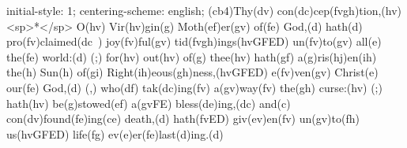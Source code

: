 initial-style: 1;
centering-scheme: english;
(cb4)Thy(dv) con(dc)cep(fvgh)tion,(hv) <sp>*</sp> O(hv) Vir(hv)gin(g) Moth(ef)er(gv) of(fe) God,(d) hath(d) pro(fv)claimed(dc~) joy(fv)ful(gv) tid(fvgh)ings(hvGFED) un(fv)to(gv) all(e) the(fe) world:(d) (;) for(hv) out(hv) of(g) thee(hv) hath(gf) a(g)ris(hj)en(ih) the(h) Sun(h) of(gi) Right(ih)eous(gh)ness,(hvGFED) e(fv)ven(gv) Christ(e) our(fe) God,(d) (,) who(df) tak(dc)ing(fv) a(gv)way(fv) the(gh) curse:(hv) (;) hath(hv) be(g)stowed(ef) a(gvFE) bless(de)ing,(dc) and(c) con(dv)found(fe)ing(ce) death,(d) hath(fvED) giv(ev)en(fv) un(gv)to(fh) us(hvGFED) life(fg) ev(e)er(fe)last(d)ing.(d)
